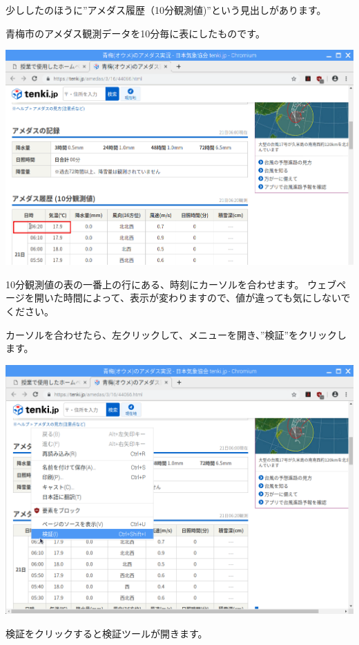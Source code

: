 \documentclass[a4paper,12pt,dvipdfmx]{jarticle}
\begin{document}
\clearpage
少ししたのほうに”アメダス履歴（10分観測値)”という見出しがあります。

青梅市のアメダス観測データを10分毎に表にしたものです。



\begin{center}
\includegraphics[width=17.006cm]{textbook-img033.png}

\end{center}
10分観測値の表の一番上の行にある、時刻にカーソルを合わせます。
ウェブページを開いた時間によって、表示が変わりますので、値が違っても気にしないでください。

カーソルを合わせたら、左クリックして、メニューを開き、”検証”をクリックします。

\begin{center}
\includegraphics[width=17.006cm]{textbook-img034.png}

\end{center}
\clearpage
検証をクリックすると検証ツールが開きます。
\end{document}

